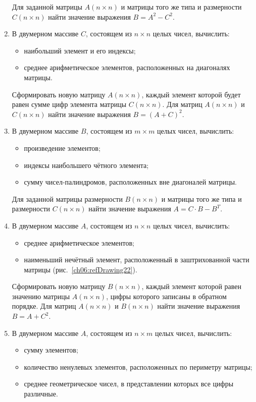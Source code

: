 \begin{enumerate}
Для заданной матрицы $A(n\times n)$ и матрицы того же типа и размерности
$C(n\times n)$ найти значение выражения  $B=A^2-C^2$.


\item В двумерном массиве $C$, состоящем из $n\times n$ целых чисел, вычислить:

\begin{itemize}
\item наибольший элемент и его индексы;
\item среднее арифметическое элементов, расположенных на диагоналях матрицы.
\end{itemize}

Сформировать новую матрицу $A(n\times n)$, каждый элемент которой будет равен сумме цифр
элемента матрицы $C(n\times n)$. Для матриц $A(n\times n)$ и
$C(n\times n)$ найти значение выражения  $B=(A+C)^2$.
\item В двумерном массиве $B$, состоящем из $m\times m$ целых чисел, вычислить: 
\begin{itemize}
\item произведение элементов;
\item индексы наибольшего чётного элемента;
\item сумму чисел-палиндромов, расположенных вне диагоналей матрицы.
\end{itemize}

Для заданной матрицы размерности $B(n\times n)$ и матрицы того же типа и
размерности $C(n\times n)$ найти значение выражения   $A=C\cdot B-B^T$.
\item В двумерном массиве $A$, состоящем из $n\times n$ целых чисел, вычислить:

\begin{itemize}
\item среднее арифметическое элементов;
\item наименьший нечётный элемент, расположенный в заштрихованной части матрицы (рис.~\ref{ch06:refDrawing22}).
\end{itemize}

Сформировать новую матрицу $B(n\times n)$, каждый элемент которой равен значению матрицы
$A(n\times n)$, цифры которого записаны в обратном порядке. Для матриц
$A(n\times n)$ и $B(n\times n)$ найти значение выражения  $B=A+C^2$.


\item В двумерном массиве $A$, состоящем из $n\times m$ целых чисел, вычислить: 

\begin{itemize}
\item сумму элементов;
\item количество ненулевых элементов, расположенных по периметру матрицы;
\item среднее геометрическое чисел, в представлении которых все цифры различные.
\end{itemize}


\end{enumerate}
